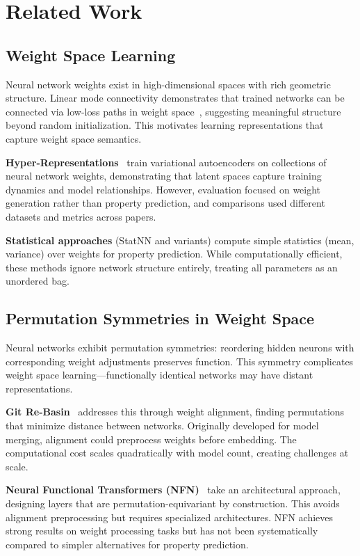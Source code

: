 \section{Related Work}
\label{sec:related_work}

\subsection{Weight Space Learning}

Neural network weights exist in high-dimensional spaces with rich geometric structure. Linear mode connectivity demonstrates that trained networks can be connected via low-loss paths in weight space~\cite{frankle2020linear}, suggesting meaningful structure beyond random initialization. This motivates learning representations that capture weight space semantics.

\textbf{Hyper-Representations}~\cite{schurholt2022hyper} train variational autoencoders on collections of neural network weights, demonstrating that latent spaces capture training dynamics and model relationships. However, evaluation focused on weight generation rather than property prediction, and comparisons used different datasets and metrics across papers.

\textbf{Statistical approaches} (StatNN and variants) compute simple statistics (mean, variance) over weights for property prediction. While computationally efficient, these methods ignore network structure entirely, treating all parameters as an unordered bag.

\subsection{Permutation Symmetries in Weight Space}

Neural networks exhibit permutation symmetries: reordering hidden neurons with corresponding weight adjustments preserves function. This symmetry complicates weight space learning---functionally identical networks may have distant representations.

\textbf{Git Re-Basin}~\cite{ainsworth2022git} addresses this through weight alignment, finding permutations that minimize distance between networks. Originally developed for model merging, alignment could preprocess weights before embedding. The computational cost scales quadratically with model count, creating challenges at scale.

\textbf{Neural Functional Transformers (NFN)}~\cite{zhou2024neural} take an architectural approach, designing layers that are permutation-equivariant by construction. This avoids alignment preprocessing but requires specialized architectures. NFN achieves strong results on weight processing tasks but has not been systematically compared to simpler alternatives for property prediction.

